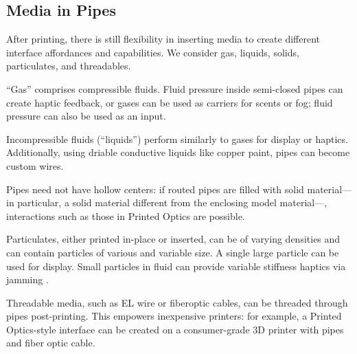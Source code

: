 \subsection{Media in Pipes}
After printing, there is still flexibility in inserting media to create different interface affordances and capabilities. We consider gas, liquids, solids, particulates, and threadables.

``Gas'' comprises compressible fluids.  Fluid pressure inside semi-closed pipes can create haptic feedback, or gases can be used as carriers for scents or fog; fluid pressure can also be used as an input.

Incompressible fluids (``liquids'') perform similarly to gases for display or haptics.  Additionally, using driable conductive liquids like copper paint, pipes can become custom wires.

Pipes need not have hollow centers: if routed pipes are filled with solid material---in particular, a solid material different from the enclosing model material---, interactions such as those in Printed Optics \cite{Willis-printedoptics} are possible.

Particulates, either printed in-place or inserted, can be of varying densities and can contain particles of various and variable size.  A single large particle can be used for display.  Small particles in fluid can provide variable stiffness haptics via jamming \cite{Follmer-jamming}.

Threadable media, such as EL wire or fiberoptic cables, can be threaded through pipes post-printing.  This empowers inexpensive printers: for example, a Printed Optics-style interface can be created on a consumer-grade 3D printer with pipes and fiber optic cable.
